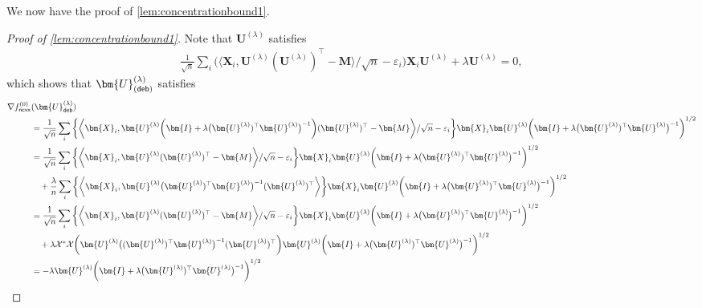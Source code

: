 \documentclass[10pt]{article}
\newcommand{\eps}{\ensuremath{\varepsilon}}
\newcommand{\s}{^*}
\renewcommand{\t}{^{\top}}
\newcommand{\inv}{^{-1}}
\theoremstyle{definition}
\begin{document}
We now have the proof of \cref{lem:concentrationbound1}.  
\begin{proof}[Proof of \cref{lem:concentrationbound1}]
      Note that $\bm{U}^{(\lambda)}$ satisfies
\begin{align}
  \frac{1}{\sqrt{n}} \sum_{i}  \bigg( \bigg \langle \bm{X}_i , \bm{U}^{(\lambda)} (\bm{U}^{(\lambda)})\t - \bm{M} \bigg \rangle / \sqrt{n} - \eps_i \bigg) \bm{X}_i \bm{U}^{(\lambda)} + \lambda \bm{U}^{(\lambda)} = 0,
\end{align}
which shows that $\bm{U}^{(\lambda)}_{({\sf deb})}$ satisfies
\begin{align}
\nabla f^{(0)}_{{\sf ncvx}}&( \bm{U}^{(\lambda)}_{{\sf deb}} ) \\
& =   \frac{1}{\sqrt{n}}  \sum_{i}  \bigg\{ \bigg \langle \bm{X}_i , \bm{U}^{(\lambda)} \bigg( \bm{I} + \lambda \big( \bm{U}^{(\lambda)})\t \bm{U}^{(\lambda)} \big)\inv \bigg) (\bm{U}^{(\lambda)})\t - \bm{M} \bigg \rangle /\sqrt{n}- \eps_i \bigg\} \bm{X}_i \bm{U}^{(\lambda)} \bigg( \bm{I} + \lambda \big( \bm{U}^{(\lambda)})\t \bm{U}^{(\lambda)} \big)\inv \bigg)^{1/2} \\
      &=  \frac{1}{\sqrt{n}}\sum_{i}  \bigg\{ \bigg \langle \bm{X}_i , \bm{U}^{(\lambda)}  (\bm{U}^{(\lambda)})\t - \bm{M} \bigg \rangle/\sqrt{n} - \eps_i \bigg\} \bm{X}_i \bm{U}^{(\lambda)} \bigg( \bm{I} + \lambda \big( \bm{U}^{(\lambda)})\t \bm{U}^{(\lambda)} \big)\inv \bigg)^{1/2} \\
      &\quad+ \frac{\lambda}{n} \sum_{i} \bigg\{ \bigg \langle \bm{X}_i , \bm{U}^{(\lambda)} \big( \bm{U}^{(\lambda)})\t \bm{U}^{(\lambda)} \big)\inv  (\bm{U}^{(\lambda)})\t  \bigg \rangle  \bigg\} \bm{X}_i \bm{U}^{(\lambda)} \bigg( \bm{I} + \lambda \big( \bm{U}^{(\lambda)})\t \bm{U}^{(\lambda)} \big)\inv \bigg)^{1/2} \\
      &= \frac{1}{\sqrt{n}} \sum_{i}  \bigg\{ \bigg \langle \bm{X}_i , \bm{U}^{(\lambda)}  (\bm{U}^{(\lambda)})\t - \bm{M} \bigg \rangle /\sqrt{n}- \eps_i \bigg\} \bm{X}_i \bm{U}^{(\lambda)} \bigg( \bm{I} + \lambda \big( \bm{U}^{(\lambda)})\t \bm{U}^{(\lambda)} \big)\inv \bigg)^{1/2} \\
      &\quad+ \lambda \mathcal{X}\s \mathcal{X} \bigg( \bm{U}^{(\lambda)} \big( ( \bm{U}^{(\lambda)})\t \bm{U}^{(\lambda)} \big)\inv (\bm{U}^{(\lambda)} )\t  \bigg) \bm{U}^{(\lambda)} \bigg( \bm{I} + \lambda \big( \bm{U}^{(\lambda)})\t \bm{U}^{(\lambda)} \big)\inv \bigg)^{1/2} \\
      &= -\lambda \bm{U}^{(\lambda)}  \bigg( \bm{I} + \lambda \big( \bm{U}^{(\lambda)})\t \bm{U}^{(\lambda)} \big)\inv \bigg)^{1/2} \\

\end{align}
\end{proof}
\end{document}
